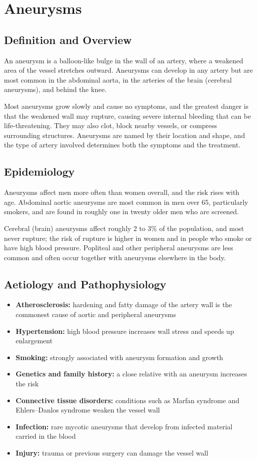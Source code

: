 \chapter{Aneurysms}

\section*{Definition and Overview}
An aneurysm is a balloon-like bulge in the wall of an artery, where a weakened area of the vessel stretches outward. Aneurysms can develop in any artery but are most common in the abdominal aorta, in the arteries of the brain (cerebral aneurysms), and behind the knee.

Most aneurysms grow slowly and cause no symptoms, and the greatest danger is that the weakened wall may rupture, causing severe internal bleeding that can be life-threatening. They may also clot, block nearby vessels, or compress surrounding structures. Aneurysms are named by their location and shape, and the type of artery involved determines both the symptoms and the treatment.

\section*{Epidemiology}
Aneurysms affect men more often than women overall, and the risk rises with age. Abdominal aortic aneurysms are most common in men over 65, particularly smokers, and are found in roughly one in twenty older men who are screened.

Cerebral (brain) aneurysms affect roughly 2 to 3\% of the population, and most never rupture; the risk of rupture is higher in women and in people who smoke or have high blood pressure. Popliteal and other peripheral aneurysms are less common and often occur together with aneurysms elsewhere in the body.

\section*{Aetiology and Pathophysiology}
\begin{itemize}
    \item \textbf{Atherosclerosis:} hardening and fatty damage of the artery wall is the commonest cause of aortic and peripheral aneurysms
    \item \textbf{Hypertension:} high blood pressure increases wall stress and speeds up enlargement
    \item \textbf{Smoking:} strongly associated with aneurysm formation and growth
    \item \textbf{Genetics and family history:} a close relative with an aneurysm increases the risk
    \item \textbf{Connective tissue disorders:} conditions such as Marfan syndrome and Ehlers--Danlos syndrome weaken the vessel wall
    \item \textbf{Infection:} rare mycotic aneurysms that develop from infected material carried in the blood
    \item \textbf{Injury:} trauma or previous surgery can damage the vessel wall
\end{itemize}


